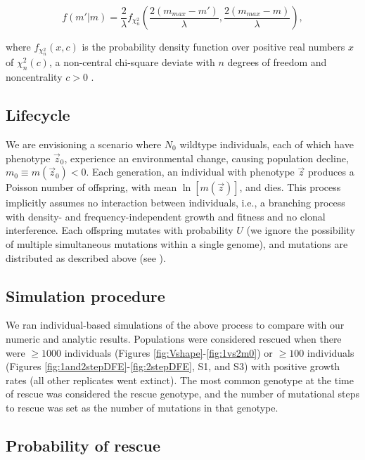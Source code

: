 \documentclass[9pt,twocolumn,twoside,lineno]{gsajnl}
\begin{document}
\begin{equation}\label{eq:fm}
f(m' | m) = \frac{2}{\lambda} f_{\chi_n^2} \left( \frac{2(m_{max} - m')}{\lambda}, \frac{2(m_{max}-m)}{\lambda} \right),
\end{equation}

\noindent where $f_{\chi_n^2}(x, c)$ is the probability density function over positive real numbers $x$ of $\chi_n^2(c)$, a non-central chi-square deviate with $n$ degrees of freedom and noncentrality $c>0$ \citep[equation 26.4.25 in][]{Abramowitz1972}.

\subsection{Lifecycle}

We are envisioning a scenario where $N_0$ wildtype individuals, each of which have phenotype $\vec{z}_0$, experience an environmental change, causing population decline, $m_0\equiv m(\vec{z}_0)<0$.
Each generation, an individual with phenotype $\vec{z}$ produces a Poisson number of offspring, with mean $\ln[m(\vec{z})]$, and dies.
This process implicitly assumes no interaction between individuals, i.e., a branching process with density- and frequency-independent growth and fitness and no clonal interference.
Each offspring mutates with probability $U$ (we ignore the possibility of multiple simultaneous mutations within a single genome), and mutations are distributed as described above (see ).

\subsection{Simulation procedure}
\label{sec:sims}

We ran individual-based simulations of the above process to compare with our numeric and analytic results.
Populations were considered rescued when there were $\geq1000$ individuals (Figures \ref{fig:Vshape}-\ref{fig:1vs2m0}) or $\geq100$ individuals (Figures \ref{fig:1and2stepDFE}-\ref{fig:2stepDFE}, S1, and S3) with positive growth rates (all other replicates went extinct).
The most common genotype at the time of rescue was considered the rescue genotype, and the number of mutational steps to rescue was set as the number of mutations in that genotype. 

\subsection{Probability of rescue}
\end{document}
